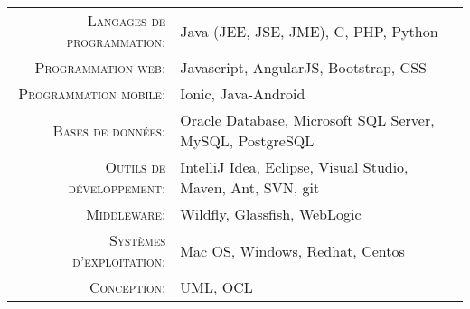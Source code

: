 %
%
%

\renewcommand{\arraystretch}{1.1}

	\begin{tabular}{>{}r>{}p{13cm}}
		\textsc{Langages de programmation:}  		&   Java (JEE, JSE, JME), C, PHP, Python\\
		\textsc{Programmation web:}               	&   Javascript, AngularJS, Bootstrap, CSS\\
		\textsc{Programmation mobile:}               	&   Ionic, Java-Android\\
		\textsc{Bases de données:}                  &   Oracle Database, Microsoft SQL Server, MySQL, PostgreSQL \\
		\textsc{Outils de développement:}	  		&   IntelliJ Idea, Eclipse, Visual Studio, Maven, Ant, SVN, git\\
		\textsc{Middleware:}				        &   Wildfly, Glassfish, WebLogic\\
		\textsc{Systèmes d'exploitation:}	        &   Mac OS, Windows, Redhat, Centos\\
		\textsc{Conception:}				        &   UML, OCL\\
	\end{tabular}
